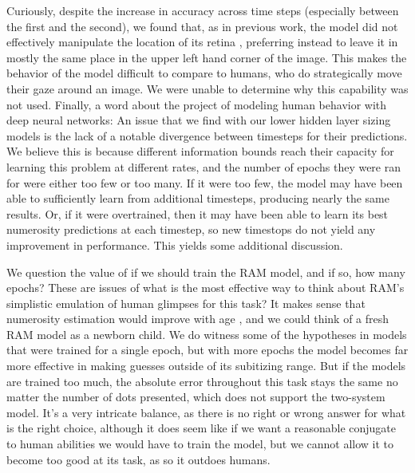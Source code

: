\documentclass{article}
\begin{document}
Curiously, despite the increase in accuracy across time steps (especially between the first and the second), we found that, as in previous work, the model did not effectively manipulate the location of its retina \cite{mcclelland}, preferring instead to leave it in mostly the same place in the upper left hand corner of the image. This makes the behavior of the model difficult to compare to humans, who do strategically move their gaze around an image. We were unable to determine why this capability was not used. \newline
Finally, a word about the project of modeling human behavior with deep neural networks:\newline
An issue that we find with our lower hidden layer sizing models is the lack of a notable divergence between timesteps for their predictions. We believe this is because different information bounds reach their capacity for learning this problem at different rates, and the number of epochs they were ran for were either too few or too many. If it were too few, the model may have been able to sufficiently learn from additional timesteps, producing nearly the same results. Or, if it were overtrained, then it may have been able to learn its best numerosity predictions at each timestep, so new timestops do not yield any improvement in performance. This yields some additional discussion.

We question the value of if we should train the RAM model, and if so, how many epochs? These are issues of what is the most effective way to think about RAM's simplistic emulation of human glimpses for this task? It makes sense that numerosity estimation would improve with age \cite{mcclelland}, and we could think of a fresh RAM model as a newborn child. We do witness some of the hypotheses in models that were trained for a single epoch, but with more epochs the model becomes far more effective in making guesses outside of its subitizing range. But if the models are trained too much, the absolute error throughout this task stays the same no matter the number of dots presented, which does not support the two-system model. It's a very intricate balance, as there is no right or wrong answer for what is the right choice, although it does seem like if we want a reasonable conjugate to human abilities we would have to train the model, but we cannot allow it to become too good at its task, as so it outdoes humans.
\end{document}
